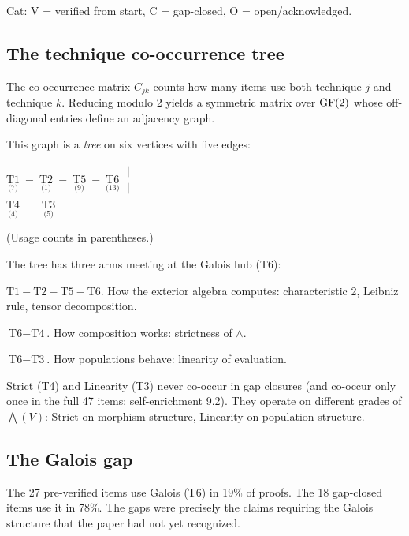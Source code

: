 \noindent Cat: V = verified from start, C = gap-closed,
O = open/acknowledged.

\subsection{The technique co-occurrence tree}
\label{sec:technique-tree}

The co-occurrence matrix $C_{jk}$ counts how many items
use both technique $j$ and technique $k$. Reducing
modulo 2 yields a symmetric matrix over $\operatorname{GF}(2)$ whose
off-diagonal entries define an adjacency graph.

This graph is a \emph{tree} on six vertices with five
edges:
\begin{center}
$\underset{\text{(7)}}{\text{T1}}
\;{-}\;
\underset{\text{(1)}}{\text{T2}}
\;{-}\;
\underset{\text{(9)}}{\text{T5}}
\;{-}\;
\underset{\text{(13)}}{\text{T6}}
\;{\begin{array}{c} | \\ | \end{array}}$
\\[2pt]
$\underset{\text{(4)}}{\text{T4}} \quad\quad
\underset{\text{(5)}}{\text{T3}}$
\end{center}
(Usage counts in parentheses.)

The tree has three arms meeting at the Galois hub (T6):
\begin{description}[nosep,leftmargin=1.5cm]
  \item[Algebraic arm]
    $\text{T1} - \text{T2} - \text{T5} - \text{T6}$.
    How the exterior algebra computes: characteristic 2,
    Leibniz rule, tensor decomposition.
  \item[Coherence arm] $\text{T6} - \text{T4}$. How
    composition works: strictness of $\wedge$.
  \item[Constraint arm] $\text{T6} - \text{T3}$. How
    populations behave: linearity of evaluation.
\end{description}

Strict (T4) and Linearity (T3) never co-occur in
gap closures (and co-occur only once in the full 47
items: self-enrichment 9.2). They operate on different
grades of $\bigwedge(V)$: Strict on morphism structure,
Linearity on population structure.

\subsection{The Galois gap}

The 27 pre-verified items use Galois (T6) in 19\% of
proofs. The 18 gap-closed items use it in 78\%. The
gaps were precisely the claims requiring the Galois
structure that the paper had not yet recognized.


